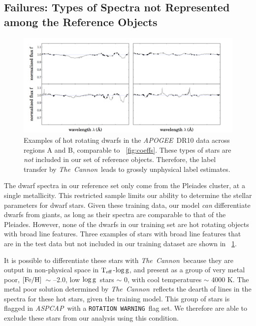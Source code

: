 \documentclass[12pt, preprint]{aastex}
\newcommand{\tc}{\textsl{The~Cannon}}
\newcommand{\apogee}{\textsl{APOGEE}}
\newcommand{\aspcap}{\textsl{ASPCAP}}
\newcommand{\rotwarn}{\texttt{ROTATION WARNING}}
\newcommand{\teff}{\mbox{$\rm T_{eff}$}}
\newcommand{\feh}{\mbox{$\rm [Fe/H]$}}
\newcommand{\logg}{\mbox{$\rm \log g$}}
\begin{document}
\subsection{Failures: Types of Spectra not Represented among the Reference Objects}
\label{sec:AnomalousSpectra}

  \begin{figure}[!h]
   \centering
 \includegraphics[width=\hsize]{./plots/2dwarfs.png}
  \caption{Examples of hot rotating dwarfs in the \apogee\ DR10 data across regions A and B, comparable to \figurename~\ref{fig:coeffs}. These types of stars are \textit{not} included in our set of reference objects. Therefore, the label transfer by \tc\ leads to grossly unphysical label estimates.}
\label{fig:dwarfs}
\end{figure}


The dwarf spectra in our reference set only come from the Pleiades cluster, at a single metallicity. 
This restricted sample limits our ability to determine the stellar parameters for dwarf stars. 
Given these training data, our model \textit{can} differentiate dwarfs from giants, as long as their spectra are comparable to that of the Pleiades. 
However, none of the dwarfs in our training set are hot rotating objects with broad line features. 
Three examples of stars with broad line features that are in the test data but not included in our training dataset are shown in \figurename~\ref{fig:dwarfs}.

It is possible to differentiate these stars with \tc\ because they are output in non-physical space in \teff-\logg, and present as a group of very metal poor, \feh\ $\sim$ --2.0, low \logg\ stars $\sim$ 0, with cool temperatures $\sim$ 4000 K. The metal poor solution determined by \tc\ reflects the dearth of lines in the spectra for these hot stars, given the training model. This group of stars is flagged in \aspcap\ with a \rotwarn\ flag set. We therefore are able to exclude these stars from our analysis using this condition. 
 
\end{document}
